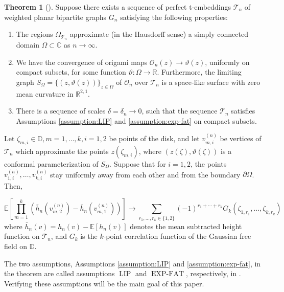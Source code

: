 \documentclass[12pt]{amsart}
\numberwithin{equation}{section}
\theoremstyle{definition}
\newtheorem{thm}{Theorem}[section]
\begin{document}
\begin{thm}[\cite{MR4588721}]
    \label{thm:Main_thm_CLR21}
    Suppose there exists a sequence of perfect t-embeddings $\mathcal{T}_n$ of weighted planar bipartite graphs ${G}_n$ satisfying the following properties:
\begin{enumerate}
    \item \label{hyp: domain} The regions $\Omega_{\mathcal{T}_n}$ approximate (in the Hausdorff sense) a simply connected domain $\Omega \subset \mathbb{C}$ as $n \rightarrow \infty$.
    \item \label{hyp:convergence}We have the convergence of origami maps $\mathcal{O}_n(z) \rightarrow \vartheta(z)$, uniformly on compact subsets, for some function $\vartheta: \Omega \rightarrow \mathbb{R}$. Furthermore, the limiting graph $S_{\Omega}=\{(z, \vartheta(z))\}_{z \in \Omega}$ of $\mathcal{O}_n$ over $\mathcal{T}_n$ is a space-like surface with zero mean curvature in $\mathbb{R}^{2,1}$.
    \item \label{hyp:technical} There is a sequence of scales $\delta=\delta_n \rightarrow 0$, such that the sequence $\mathcal{T}_n$ satisfies Assumptions \ref{assumption:LIP} and \ref{assumption:exp-fat} on compact subsets.
\end{enumerate}
Let $\zeta_{m, i} \in \mathbb{D}, m=1, \ldots, k, i=1,2$ be points of the disk, and let $v_{m, i}^{(n)}$ be vertices of $\mathcal{T}_n$ which approximate the points $z\left(\zeta_{m, i}\right)$, where $(z(\zeta), \vartheta(\zeta))$ is a conformal parameterization of $S_{\Omega}$. Suppose that for $i=1,2$, the points $v_{1, i}^{(n)}, \ldots, v_{k, i}^{(n)}$ stay uniformly away from each other and from the boundary $\partial \Omega$. Then,

$$
\mathbb{E}\left[\prod_{m=1}^k\left(\bar{h}_n\left(v_{m, 2}^{(n)}\right)-\bar{h}_n\left(v_{m, 1}^{(n)}\right)\right)\right] \rightarrow \sum_{r_1, \ldots, r_k \in\{1,2\}}(-1)^{r_1+\cdots+r_k} G_k\left(\zeta_{1, r_1}, \ldots, \zeta_{k, r_k}\right)
$$
where $\bar{h}_n(v)=h_n(v)-\mathbb{E}\left[h_n(v)\right]$ denotes the mean subtracted height function on $\mathcal{T}_n$, and $G_k$ is the $k$-point correlation function of the Gaussian free field on $\mathbb{D}$.

\end{thm}

The two assumptions, Assumptions \ref{assumption:LIP} and \ref{assumption:exp-fat}, in the theorem are called assumptions $\operatorname{LIP}$ and $\operatorname{EXP-FAT}$, respectively, in \cite{MR4588721}. Verifying these assumptions will be the main goal of this paper.   
\end{document}
